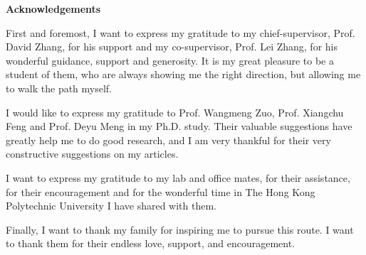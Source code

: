 
\Large\begin{center}
\textbf{Acknowledgements} \end{center}         \normalsize
First and foremost, I want to express my gratitude to my chief-supervisor, Prof. David Zhang, for his support and my co-supervisor, Prof. Lei Zhang, for his wonderful guidance, support and generosity. It is my great pleasure to be a student of them, who are always showing me the right direction, but allowing me to walk the path myself.

I would like to express my gratitude to Prof. Wangmeng Zuo, Prof. Xiangchu Feng
and Prof. Deyu Meng in my Ph.D. study. Their valuable suggestions have greatly help me
to do good research, and I am very thankful for their very constructive suggestions on my
articles. 

I want to express my gratitude to my lab and office mates, for their assistance, for
their encouragement and for the wonderful time in The Hong Kong Polytechnic University I
have shared with them.

Finally, I want to thank my family for inspiring me to pursue this route. I want to
thank them for their endless love, support, and encouragement.
